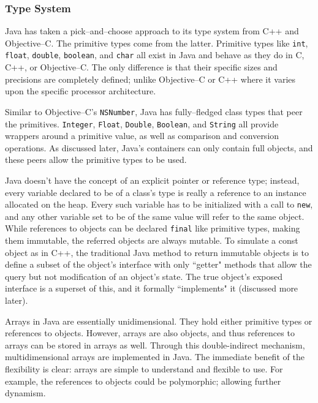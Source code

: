
\subsubsection{Type System}

Java has taken a pick--and--choose approach to its type system from C++ and
Objective--C. The primitive types come from the latter. Primitive types like
\texttt{int}, \texttt{float}, \texttt{double}, \texttt{boolean}, and
\texttt{char} all exist in Java and behave as they do in C, C++, or
Objective--C. The only difference is that their specific sizes and precisions
are completely defined; unlike Objective--C or C++ where it varies upon the
specific processor architecture.

Similar to Objective--C's \texttt{NSNumber}, Java has fully--fledged class
types that peer the primitives. \texttt{Integer}, \texttt{Float},
\texttt{Double}, \texttt{Boolean}, and \texttt{String} all provide wrappers
around a primitive value, as well as comparison and conversion operations. As
discussed later, Java's containers can only contain full objects, and these
peers allow the primitive types to be used.

Java doesn't have the concept of an explicit pointer or reference type;
instead, every variable declared to be of a class's type is really a reference
to an instance allocated on the heap. Every such variable has to be
initialized with a call to \texttt{new}, and any other variable set to be of
the same value will refer to the same object. While references to objects can
be declared \texttt{final} like primitive types, making them immutable, the
referred objects are always mutable. To simulate a const object as in C++, the
traditional Java method to return immutable objects is to define a subset of
the object's interface with only ``getter" methods that allow the query but
not modification of an object's state. The true object's exposed interface is
a superset of this, and it formally ``implements" it (discussed more later).

Arrays in Java are essentially unidimensional. They hold either primitive
types or references to objects. However, arrays are also objects, and thus
references to arrays can be stored in arrays as well. Through this
double-indirect mechanism, multidimensional arrays are implemented in Java.
The immediate benefit of the flexibility is clear: arrays are simple to
understand and flexible to use. For example, the references to objects could
be polymorphic; allowing further dynamism.

